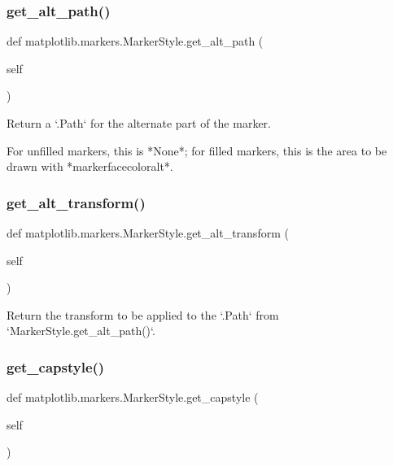 \subsubsection{\texorpdfstring{get\+\_\+alt\+\_\+path()}{get\_alt\_path()}}
{\footnotesize\ttfamily def matplotlib.\+markers.\+Marker\+Style.\+get\+\_\+alt\+\_\+path (\begin{DoxyParamCaption}\item[{}]{self }\end{DoxyParamCaption})}

\begin{DoxyVerb}Return a `.Path` for the alternate part of the marker.

For unfilled markers, this is *None*; for filled markers, this is the
area to be drawn with *markerfacecoloralt*.
\end{DoxyVerb}
 \mbox{\label{classmatplotlib_1_1markers_1_1MarkerStyle_a22118eff1397b908c0f909a008e49ced}} 
\subsubsection{\texorpdfstring{get\+\_\+alt\+\_\+transform()}{get\_alt\_transform()}}
{\footnotesize\ttfamily def matplotlib.\+markers.\+Marker\+Style.\+get\+\_\+alt\+\_\+transform (\begin{DoxyParamCaption}\item[{}]{self }\end{DoxyParamCaption})}

\begin{DoxyVerb}Return the transform to be applied to the `.Path` from
`MarkerStyle.get_alt_path()`.
\end{DoxyVerb}
 \mbox{\label{classmatplotlib_1_1markers_1_1MarkerStyle_a0362e7c538819a39dc20eae58de60323}} 
\subsubsection{\texorpdfstring{get\+\_\+capstyle()}{get\_capstyle()}}
{\footnotesize\ttfamily def matplotlib.\+markers.\+Marker\+Style.\+get\+\_\+capstyle (\begin{DoxyParamCaption}\item[{}]{self }\end{DoxyParamCaption})}

